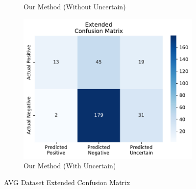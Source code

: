 \documentclass{ieeeaccess}
\begin{document}
\begin{figure}[H]
\begin{subfigure}[b]{0.32\textwidth}
        \caption{Our Method (Without Uncertain)}
        \label{fig:pta-symptom-method1}
    \end{subfigure}
    \hfill
    \begin{subfigure}[b]{0.32\textwidth}
        \centering
        \includegraphics[width=\linewidth]{new_with_AVG.pdf}
        \caption{Our Method (With Uncertain)}
        \label{fig:pta-symptom-method2}
    \end{subfigure}

    \caption{AVG Dataset Extended Confusion Matrix}
    \label{fig:AVG_ECM}
\end{figure}
\end{document}
